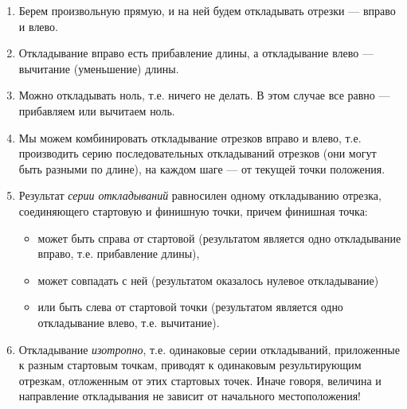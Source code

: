 \begin{enumerate}\setlength{\itemsep}{1pt}
\item Берем произвольную прямую, и на ней будем откладывать отрезки --- вправо и влево.
\item Откладывание вправо есть прибавление длины, а откладывание влево --- вычитание (уменьшение) длины.
\item Можно откладывать ноль, т.е. ничего не делать. В этом случае все равно --- прибавляем или вычитаем ноль.
\item Мы можем комбинировать откладывание отрезков вправо и влево, т.е. производить серию последовательных откладываний отрезков (они могут быть разными по длине), на каждом шаге --- от текущей точки положения.
\item Результат \textit{серии откладываний} равносилен одному откладыванию отрезка, соединяющего стартовую и финишную точки, причем финишная точка:
\begin{itemize}
\item может быть справа от стартовой (результатом является одно откладывание вправо, т.е. прибавление длины),
\item может совпадать с ней (результатом оказалось нулевое откладывание)
\item или быть слева от стартовой точки (результатом является одно откладывание влево, т.е. вычитание).
\end{itemize}
\item Откладывание \textit{изотропно}, т.е. одинаковые серии откладываний, приложенные к разным стартовым точкам, приводят к одинаковым результирующим отрезкам, отложенным от этих стартовых точек. Иначе говоря, величина и направление откладывания не зависит от начального местоположения!
\end{enumerate}
